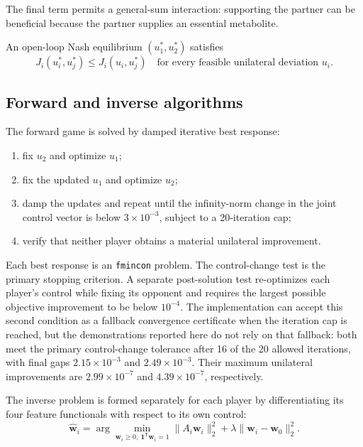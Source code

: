 \documentclass[11pt,a4paper]{article}
\newcommand{\vect}[1]{\boldsymbol{#1}}
\begin{document}
The final term permits a general-sum interaction: supporting the partner can
be beneficial because the partner supplies an essential metabolite.

An open-loop Nash equilibrium
\((u_1^{*},u_2^{*})\) satisfies
\begin{equation}
  J_i(u_i^{*},u_j^{*})
  \le
  J_i(u_i,u_j^{*})
  \quad
  \text{for every feasible unilateral deviation }u_i.
\end{equation}

\subsection{Forward and inverse algorithms}

The forward game is solved by damped iterative best response:
\begin{enumerate}
  \item fix \(u_2\) and optimize \(u_1\);
  \item fix the updated \(u_1\) and optimize \(u_2\);
  \item damp the updates and repeat until the infinity-norm change in the
        joint control vector is below \(3\times10^{-3}\), subject to a
        20-iteration cap;
  \item verify that neither player obtains a material unilateral improvement.
\end{enumerate}
Each best response is an \texttt{fmincon} problem. The control-change test is
the primary stopping criterion. A separate post-solution test re-optimizes
each player's control while fixing its opponent and requires the largest
possible objective improvement to be below \(10^{-4}\). The implementation
can accept this second condition as a fallback convergence certificate when
the iteration cap is reached, but the demonstrations reported here do not
rely on that fallback: both meet the primary control-change tolerance after
16 of the 20 allowed iterations, with final gaps \(2.15\times10^{-3}\) and
\(2.49\times10^{-3}\). Their maximum unilateral improvements are
\(2.99\times10^{-7}\) and \(4.39\times10^{-7}\), respectively.

The inverse problem is formed separately for each player by differentiating
its four feature functionals with respect to its own control:
\begin{equation}
  \hat{\vect{w}}_i =
  \arg\min_{\vect{w}_i\ge0,\
             \vect{1}^{\mathsf T}\vect{w}_i=1}
  \|A_i\vect{w}_i\|_2^2
  +\lambda\|\vect{w}_i-\vect{w}_0\|_2^2.
\end{equation}
\end{document}
